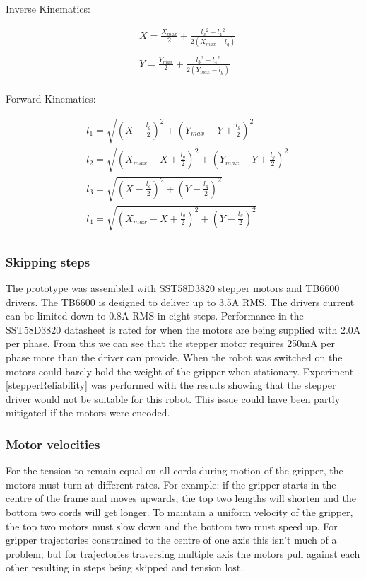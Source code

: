 \documentclass[conference]{IEEEtran}
\begin{document}
	Inverse Kinematics:
	
	\begin{equation}
	\begin{aligned}
	&X = \frac{X_{max}}{2} + \frac{l_3{}^2 - l_4{}^2}{2\left(X_{max} - l_g\right)}\\ \\
	&Y = \frac{Y_{max}}{2} + \frac{l_3{}^2 - l_4{}^2}{2\left(Y_{max} - l_g\right)}\\
	\end{aligned}
	\end{equation}
	
	Forward Kinematics:
	
	\begin{equation}
	\begin{aligned}
	&l_1 = \sqrt{\left(X - \frac{l_g}{2}\right)^2 + \left(Y_{max}-Y+\frac{l_g}{2}\right)^2}\\
	&l_2 = \sqrt{\left(X_{max}-X+\frac{l_g}{2}\right)^2 + \left(Y_{max}-Y+\frac{l_g}{2}\right)^2}\\
	&l_3 = \sqrt{\left(X-\frac{l_g}{2}\right)^2 + \left(Y-\frac{l_g}{2}\right)^2}\\
	&l_4 = \sqrt{\left(X_{max}-X+\frac{l_g}{2}\right)^2 + \left(Y-\frac{l_g}{2}\right)^2}\\
	\end{aligned}
	\end{equation}
	
	\subsubsection{Skipping steps}\label{motor_issues}
	The prototype was assembled with SST58D3820 stepper motors and TB6600 drivers. The TB6600 is designed to deliver up to 3.5A RMS. The drivers current can be limited down to 0.8A RMS in eight steps. Performance in the SST58D3820 datasheet is rated for when the motors are being supplied with 2.0A per phase. From this we can see that the stepper motor requires 250mA per phase more than the driver can provide. When the robot was switched on the motors could barely hold the weight of the gripper when stationary. Experiment \ref{stepperReliability} was performed with the results showing that the stepper driver would not be suitable for this robot. This issue could have been partly mitigated if the motors were encoded.

	\subsubsection{Motor velocities}\label{motor_vel_problem}
	For the tension to remain equal on all cords during motion of the gripper, the motors must turn at different rates. For example: if the gripper starts in the centre of the frame and moves upwards, the top two lengths will shorten and the bottom two cords will get longer. To maintain a uniform velocity of the gripper, the top two motors must slow down and the bottom two must speed up. For gripper trajectories constrained to the centre of one axis this isn't much of a problem, but for trajectories traversing multiple axis the motors pull against each other resulting in steps being skipped and tension lost.
\end{document}
